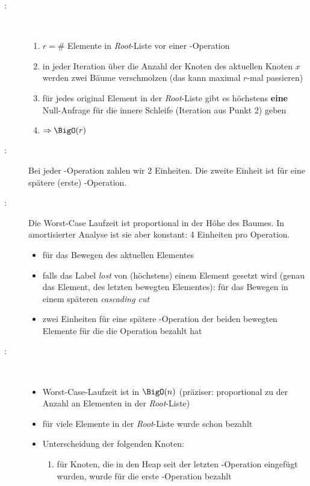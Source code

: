 \vspace*{-0.5\baselineskip}
\begin{description}
	\item[\cons:]\ \\\up
		\begin{enumerate}
			\item $r=\#$ Elemente in \textit{Root}-Liste vor einer \cons-Operation
			\item in jeder Iteration über die Anzahl der Knoten des aktuellen Knoten $x$ werden zwei Bäume verschmolzen (das kann maximal $r$-mal passieren)
			\item für jedes original Element in der \textit{Root}-Liste gibt es höchstens \textbf{eine} Null-Anfrage für die innere Schleife (Iteration aus Punkt 2) geben
			\item $\Rightarrow \BigO(r)$
		\end{enumerate}
	\item[\insert:] Bei jeder \insert-Operation zahlen wir 2 Einheiten. Die zweite Einheit ist für eine spätere (erste) \cons-Operation.
	\item[\decKey:] Die Worst-Case Laufzeit ist proportional in der Höhe des Baumes. In amortisierter Analyse ist sie aber konstant: 4 Einheiten pro Operation.
		\begin{itemize}
			\item für das Bewegen des aktuellen Elementes
			\item falls das Label \textit{lost} von (höchstens) einem Element gesetzt wird (genau das Element, des letzten bewegten Elementes): für das Bewegen in einem späteren \textit{cascading cut}
			\item zwei Einheiten für eine spätere \cons-Operation der beiden bewegten Elemente für die die Operation bezahlt hat
		\end{itemize}
	\item[\exMin:]\ \\\up
		\begin{itemize}
			\item Worst-Case-Laufzeit ist in $\BigO(n)$ (präziser: proportional zu der Anzahl an Elementen in der \textit{Root}-Liste)
			\item für viele Elemente in der \textit{Root}-Liste wurde schon bezahlt
			\item Unterscheidung der folgenden Knoten:
				\begin{enumerate}
					\item für Knoten, die in den Heap seit der letzten \exMin-Operation eingefügt wurden, wurde für die erste \cons-Operation bezahlt

\end{enumerate}
\end{itemize}
\end{description}
